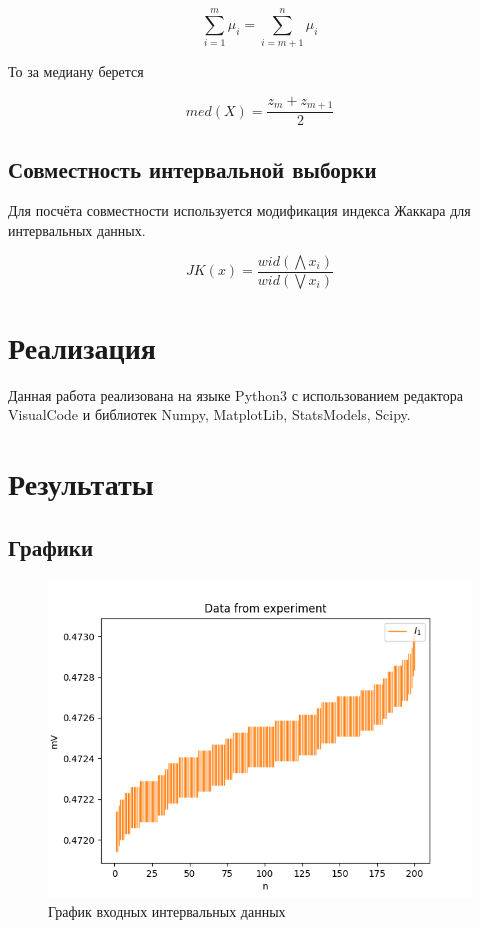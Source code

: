 \documentclass[a4paper,12pt]{article}
\begin{document}
$$\sum_{i = 1}^{m}{\mu_i} = \sum_{i = m + 1}^{n}{\mu_i}$$

То за медиану берется

$$med(X) = \frac{z_m + z_{m+1}}{2}$$

\subsection{Совместность интервальной выборки}
Для посчёта совместности используется модификация индекса Жаккара для интервальных данных.

$$JK(x) = \frac{wid(\bigwedge x_i)}{wid(\bigvee x_i)}$$

\section{Реализация}
Данная работа реализована на языке Python3 с использованием редактора VisualCode и библиотек Numpy, MatplotLib, StatsModels, Scipy. 
\section{Результаты}
\subsection{Графики}
\begin{figure}[H]
    \centering
    \includegraphics[width=15cm]{pics/input.png}
    \caption{График входных интервальных данных}
    \label{fig:input}
\end{figure}
\end{document}
